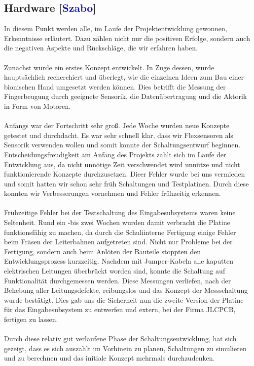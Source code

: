 \documentclass[titlepage,12pt,twoside]{article}
\begin{document}
\subsection{Hardware [\textcolor{blue}{Szabo}]}
In diesem Punkt werden alle, im Laufe der Projektentwicklung gewonnen, Erkenntnisse erläutert. Dazu zählen nicht nur die
positiven Erfolge, sondern auch die negativen Aspekte und Rückschläge, die wir erfahren haben. \\
\\
Zunächst wurde ein erstes Konzept entwickelt. In Zuge dessen, wurde hauptsächlich recherchiert und überlegt, wie die 
einzelnen Ideen zum Bau einer bionischen Hand umgesetzt werden können. Dies betrifft die Messung der Fingerbeugung durch geeignete Sensorik, 
die Datenübertragung und die Aktorik in Form von Motoren. \\
\\
Anfangs war der Fortschritt sehr groß. Jede Woche wurden neue Konzepte getestet und durchdacht. Es war sehr schnell klar, dass wir Flexsensoren
als Sensorik verwenden wollen und somit konnte der Schaltungsentwurf beginnen. Entscheidungsfreudigkeit am Anfang des Projekts zahlt sich im Laufe der Entwicklung aus,
da nicht unnötige Zeit verschwendet wird unnütze und nicht funktionierende Konzepte durchzusetzen. Dieer Fehler wurde bei uns vermieden und somit hatten wir schon sehr früh 
Schaltungen und Testplatinen. Durch diese konnten wir Verbesserungen vornehmen und Fehler frühzeitig erkennen. \\
\\
Frühzeitige Fehler bei der Testschaltung des Eingabesubsystems waren keine Seltenheit. Rund ein -bis zwei Wochen wurden damit verbracht die Platine funktionsfähig zu machen, da 
durch die Schuliinterne Fertigung einige Fehler beim Fräsen der Leiterbahnen aufgetreten sind. Nicht nur Probleme bei der Fertigung, sondern auch beim Anlöten der Bauteile stoppten 
den Entwicklungsprozess kurzzeitig. Nachdem mit Jumper-Kabeln alle kaputten elektrischen Leitungen überbrückt worden sind, konnte die Schaltung auf Funktionalität durchgemessen werden.
Diese Messungen verliefen, nach der Behebung aller Leitungsdefekte, reibungslos und das Konzept der Messschaltung wurde bestätigt. Dies gab uns die Sicherheit nun die zweite Version der
Platine für das Eingabesubsystem zu entwerfen und extern, bei der Firma JLCPCB, fertigen zu lassen. \\
\\
Durch diese relativ gut verlaufene Phase der Schaltungsentwicklung, hat sich gezeigt, dass es sich auszahlt im Vorhinein zu planen, Schaltungen zu simulieren und zu berechnen und das initiale Konzept mehrmals durchzudenken. \\
\end{document}
